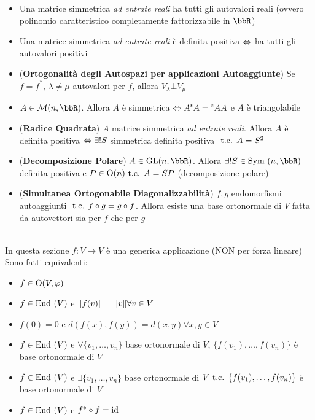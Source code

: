 \documentclass[a4paper,NoNotes,GeneralMath]{stdmdoc}
\begin{document}
\begin{itemize}
		\item Una matrice simmetrica {\it ad entrate reali} ha tutti gli autovalori reali (ovvero polinomio caratteristico completamente fattorizzabile in $\bbR$)
		\item Una matrice simmetrica {\it ad entrate reali} è definita positiva $\Leftrightarrow$ ha tutti gli autovalori positivi
		\item ({\bf Ortogonalità degli Autospazi per applicazioni Autoaggiunte}) Se $f = f^{*}$, $\lambda \neq \mu$ autovalori per $f$, allora $V_\lambda \bot V_\mu$
		\item $A \in \mathcal{M}(n, \bbR)$. Allora $A$ è simmetrica $\Leftrightarrow A {}^tA = {}^tAA$ e $A$ è triangolabile
		\item ({\bf Radice Quadrata}) $A$ matrice simmetrica {\it ad entrate reali}. Allora $A$ è definita positiva $\Leftrightarrow \exists ! S$ simmetrica definita positiva $\mbox{ t.c. } A = S^2$
		\item ({\bf Decomposizione Polare}) $A \in \GL(n, \bbR)$. Allora $\exists ! S \in \Symm(n, \bbR)$ definita positiva e $P \in \mbox{O}(n) \mbox{ t.c. } A = SP$ (decomposizione polare)
		\item ({\bf Simultanea Ortogonabile Diagonalizzabilità}) $f, g$ endomorfismi autoaggiunti $\mbox{ t.c. } f \circ g = g \circ f$. Allora esiste una base ortonormale di $V$ fatta da autovettori sia per $f$ che per $g$
	\end{itemize}

	 \\
	In questa sezione $f: V \rightarrow V$ è una generica applicazione (NON per forza lineare) \\
	Sono fatti equivalenti:
	\begin{itemize}
		\item $f \in \mbox{O}(V, \varphi)$
		\item $f \in \mbox{End }(V)$ e $\| {f(v)} \| = \| {v} \| \forall v \in V$
		\item $f(0)=0$ e $d(f(x), f(y)) = d(x, y) \forall x, y \in V$
		\item $f \in \mbox{End }(V)$ e $\forall \{v_1, \ldots, v_n\}$ base ortonormale di $V$, $\{f(v_1), \ldots, f(v_n)\}$ è base ortonormale di $V$
		\item $f \in \mbox{End }(V)$ e $\exists \{v_1, \ldots, v_n\}$ base ortonormale di $V \mbox{ t.c. } \{f(v_1), \ldots, f(v_n)\}$ è base ortonormale di $V$
		\item $f \in \mbox{End }(V)$ e $f^{*} \circ f = \mbox{id}$
	\end{itemize}
\end{document}
